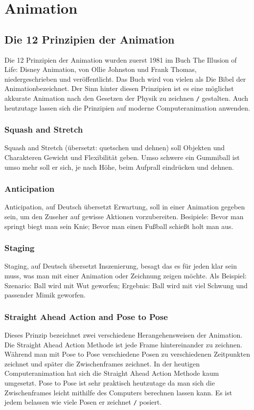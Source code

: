 \section{Animation}
\subsection{Die 12 Prinzipien der Animation}
\label{animation:principles}
Die 12 Prinzipien der Animation wurden zuerst 1981 im Buch \dq The Illusion of Life: Disney Animation\dq, von Ollie Johnston und Frank Thomas,
niedergeschrieben und veröffentlicht. Das Buch wird von vielen als \dq Die Bibel der Animation\dq bezeichnet. Der Sinn hinter diesen Prinzipien ist es eine möglichst
akkurate Animation nach den Gesetzen der Physik zu zeichnen \verb-/- gestalten. Auch heutzutage lassen sich die Prinzipien auf moderne Computeranimation anwenden.

\subsubsection{Squash and Stretch}
Squash and Stretch (übersetzt: quetschen und dehnen) soll Objekten und Charakteren Gewicht und Flexibilität geben.
 Umso schwere ein Gummiball ist umso mehr soll er sich, je nach Höhe, beim Aufprall eindrücken und dehnen.

\subsubsection{Anticipation}
Anticipation, auf Deutsch übersetzt \dq Erwartung\dq, soll in einer Animation gegeben sein, um den Zuseher auf gewisse Aktionen vorzubereiten.
Besipiele: Bevor man springt biegt man sein Knie; Bevor man einen Fußball schießt holt man aus.

\subsubsection{Staging}
Staging, auf Deutsch übersetzt \dq Inszenierung\dq, besagt das es für jeden klar sein muss, was man mit einer Animation oder Zeichnung zeigen möchte.
Als Beispiel: Szenario: Ball wird mit Wut geworfen; Ergebnis: Ball wird mit viel Schwung und passender Mimik geworfen.

\subsubsection{Straight Ahead Action and Pose to Pose}
Dieses Prinzip bezeichnet zwei verschiedene Herangehensweisen der Animation. Die Straight Ahead Action Methode ist jede Frame hintereinander zu zeichnen.
Während man mit Pose to Pose verschiedene Posen zu verschiedenen Zeitpunkten zeichnet und später die Zwischenframes zeichnet.
In der heutigen Computeranimation hat sich die Straight Ahead Action Methode kaum umgesetzt.
Pose to Pose ist sehr praktisch heutzutage da man sich die Zwischenframes leicht mithilfe des Computers berechnen lassen kann. Es ist jedem belassen wie viele Posen er zeichnet \verb-/- posiert.

